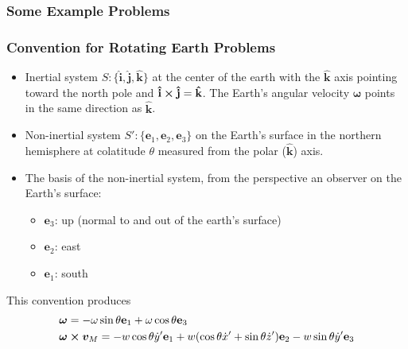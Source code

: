 \documentclass[11pt, a4paper]{article}
\newcommand{\e}{\mathbf{e}} %
\newcommand{\uvec}[1]{\bm{\hat{\mathbf{#1}}}} %
\begin{document}
\iffalse
\subsubsection{Some Example Problems}

\subsubsection{Convention for Rotating Earth Problems}
\begin{itemize}
	\item Inertial system $ S: \{\uvec{i}, \uvec{j}, \uvec{k} \} $ at the center of the earth with the $ \uvec{k} $ axis pointing toward the north pole and $ \uvec{i} \cross \uvec{j} = \uvec{k} $. The Earth's angular velocity $ \bm{\omega} $ points in the same direction as $ \uvec{k} $.
	
	\item Non-inertial system $ S' : \{\e_1, \e_2, \e_3 \} $ on the Earth's surface in the northern hemisphere at colatitude $ \theta $ measured from the polar ($ \uvec{k} $) axis. 
	
	\item The basis of the non-inertial system, from the perspective an observer on the Earth's surface:
	\begin{itemize}
		\item $ \e_3 $: up (normal to and out of the earth's surface)

		\item $ \e_2 $: east
		
		\item $ \e_1 $: south
	\end{itemize} 
	
\end{itemize}
This convention produces
\begin{align*}
	 &\bm{\omega} = -\omega \sin \theta \e_1 + \omega \cos \theta \e_3\\
	 & \bm{\omega} \cross \bm{v}_{M} = -w \cos \theta \dot{y}' \e_1 + w(\cos \theta \dot{x}' + \sin \theta \dot{z}') \e_2 - w\sin \theta \dot{y}' \e_3
\end{align*}
\end{document}
